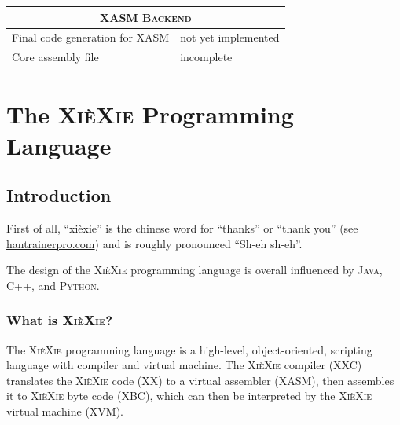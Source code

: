 \documentclass{report}
\def\xiexie{\textsc{Xi\`eXie}\xspace}
\def\xxlang{\xiexie programming language\xspace}
\def\cpp{\textsc{C++}\xspace}
\def\java{\textsc{Java}\xspace}
\def\python{\textsc{Python}\xspace}
\def\incompl{\textcolor{weakOrange}{incomplete}}
\def\notimpl{\textcolor{weakRed}{not yet implemented}}
\begin{document}
\begin{center}
\begin{tabular}[ht]{ | p{} | p{} | }
	\hline \hline
	\multicolumn{2}{|c|}{\textsc{XASM Backend}} \\
	\hline
	Final code generation for XASM & \notimpl \\
	\hline
	Core assembly file & \incompl \\
	\hline
\end{tabular}
\end{center}


\tableofcontents



\part{The \xiexie Programming Language}



\chapter{Introduction}

First of all, ``xi\`exie'' is the chinese word for ``thanks'' or ``thank you''
(see \href{http://dictionary.hantrainerpro.com/chinese-english/translation-xiexie_thankyou.htm}{hantrainerpro.com})
and is roughly pronounced ``Sh-eh sh-eh''.

The design of the \xxlang is overall influenced by \java, \cpp, and \python.



\section{What is \xiexie?}

The \xiexie programming language is a high-level, object-oriented, scripting language with compiler and virtual machine.
The \xiexie compiler (XXC) translates the \xiexie code (XX) to a virtual assembler (XASM), then assembles it to
\xiexie byte code (XBC), which can then be interpreted by the \xiexie virtual machine (XVM).
\end{document}
